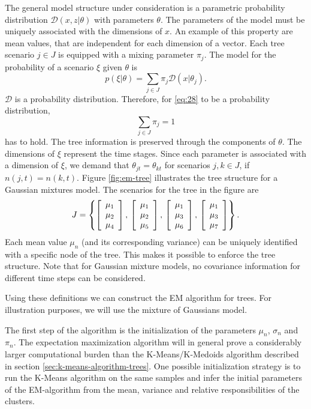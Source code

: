 The general model structure under consideration is a parametric probability distribution $\mathcal{D}(x,z|\theta)$ with parameters $\theta$.
The parameters of the model must be uniquely associated with the dimensions of $x$.
An example of this property are mean values, that are independent for each dimension of a vector.
Each tree scenario $j\in J$ is equipped with a mixing parameter $\pi_j$.
The model for the probability of a scenario $\xi$ given $\theta$ is
\begin{equation}
  \label{eq:28}
  p(\xi|\theta) = \sum_{j\in J}\pi_j\mathcal{D}(x|\theta_j).
\end{equation}
$\mathcal{D}$ is a probability distribution. Therefore, for \eqref{eq:28} to be a probability distribution,
\begin{equation}
  \label{eq:30}
  \sum_{j\in J}\pi_j = 1
\end{equation}
has to hold.
The tree information is preserved through the components of $\theta$.
The dimensions of $\xi$ represent the time stages.
Since each parameter is associated with a dimension of $\xi$, we demand that $\theta_{jt}=\theta_{kt}$ for scenarios $j,k\in J$, if $n(j,t)=n(k,t)$.
Figure \ref{fig:em-tree} illustrates the tree structure for a Gaussian mixtures model.
The scenarios for the tree in the figure are 
\[
J = \left\{\left[\begin{array}{c} \mu_1\\\mu_2\\\mu_4 \end{array}\right],\,\left[\begin{array}{c} \mu_1\\\mu_2\\\mu_5 \end{array}\right],\,\left[\begin{array}{c} \mu_1\\\mu_3\\\mu_6 \end{array}\right],\,\left[\begin{array}{c} \mu_1\\\mu_3\\\mu_7 \end{array}\right]\right\}.
\]
Each mean value $\mu_n$ (and its corresponding variance) can be uniquely identified with a specific node of the tree. This makes it possible to enforce the tree structure. Note that for Gaussian mixture models, no covariance information for different time steps can be considered.

Using these definitions we can construct the EM algorithm for trees.
For illustration purposes, we will use the mixture of Gaussians model.

The first step of the algorithm is the initialization of the parameters $\mu_n$, $\sigma_n$ and $\pi_n$.
The expectation maximization algorithm will in general prove a considerably larger computational burden than the K-Means/K-Medoids algorithm described in section \ref{sec:k-means-algorithm-trees}. 
One possible initialization strategy is to run the K-Means algorithm on the same samples and infer the initial parameters of the EM-algorithm from the mean, variance and relative responsibilities of the clusters.

